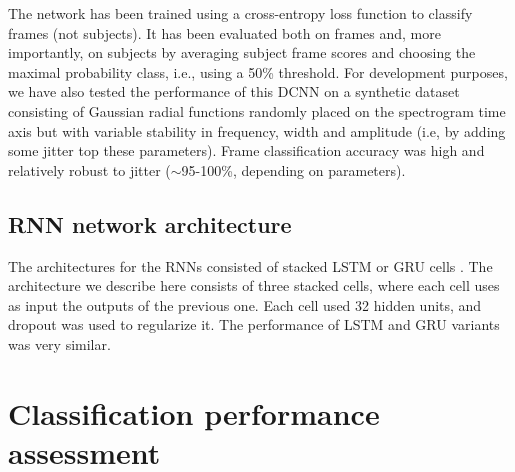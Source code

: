 \documentclass[review]{elsarticle}
\begin{document}
The network has been trained using a cross-entropy loss function to classify frames (not subjects). It has been evaluated both on frames and, more importantly, on subjects by averaging subject frame scores and choosing the maximal probability class, i.e., using a 50\% threshold. 
For development purposes, we have also tested the performance of this DCNN on a synthetic dataset consisting of Gaussian radial functions randomly placed on the spectrogram time axis but with variable stability in frequency, width and amplitude (i.e, by adding some jitter top these parameters). Frame classification accuracy was high and relatively robust to jitter ($\sim$95-100\%, depending on parameters).





\subsection{RNN network architecture}
The architectures for the RNNs consisted of stacked LSTM \cite{Hochreiter:1997aa,Goodfellow2016} or GRU cells \cite{Cho:2014aa}. The architecture we describe here consists of three stacked cells, where each cell uses as input the outputs of the previous one. Each cell used 32 hidden units, and dropout was used to regularize it. The performance of LSTM and GRU variants was very similar. 



\section{Classification performance assessment}
\end{document}
